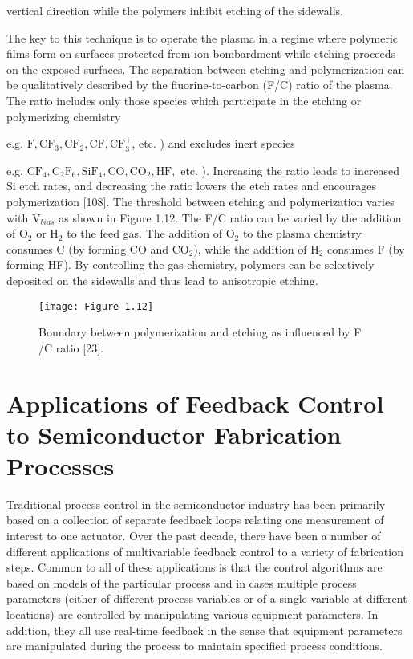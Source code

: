 {
\noindent vertical direction while the polymers inhibit etching of the sidewalls.
	
The key to this technique is to operate the plasma in a regime where polymeric films form on surfaces protected from ion bombardment while etching proceeds on the exposed surfaces. The separation between etching and polymerization can be qualitatively described by the fiuorine-to-carbon (F/C) ratio of the plasma. The ratio includes only those species which participate in the etching or polymerizing chemistry {e.g. $ \text{F}, \text{CF}_{3}, \text{CF}_{2}, \text{CF}, \text{CF}^{+}_{3} $, etc. ) and excludes inert species {e.g. $ \text{CF}_{4}, \text{C}_{2}\text{F}_{6}, \text{SiF}_{4}, \text{CO}, \text{CO}_{2}, \text{HF},$ etc. ). Increasing the ratio leads to increased Si etch rates, and decreasing the ratio lowers the etch rates and encourages polymerization [108]. The threshold between etching and polymerization varies with $\text{V}_{bias}$ as shown in Figure 1.12. The F/C ratio can be varied by the addition of $\text{O}_{2}$ or $\text{H}_{2}$ to the feed gas. The addition of $\text{O}_{2}$ to the plasma chemistry consumes C (by forming CO and $\text{CO}_{2}$), while the addition of $\text{H}_{2}$ consumes F (by forming HF). By controlling the gas chemistry, polymers can be selectively deposited on the sidewalls and thus lead to anisotropic etching.
			
\begin{figure}[H]
	\centering
	\texttt{[image: Figure 1.12]}
	\bf\caption{ Boundary between polymerization and etching as influenced by F /C ratio [23].}
	\label{fig:1.12}
\end{figure}		
			
\section{Applications of Feedback Control to Semiconductor Fabrication Processes}
			
\tab Traditional process control in the semiconductor industry has been primarily based on a collection of separate feedback loops relating one measurement of interest to one actuator. Over the past decade, there have been a number of different applications of multivariable feedback control to a variety of fabrication steps. Common to all of these applications is that the control algorithms are based on models of the particular process and in  cases multiple process parameters (either of different process variables or of a single variable at different locations) are controlled by manipulating various equipment parameters. In addition, they all use real-time feedback in the sense that equipment parameters are manipulated during the process to maintain specified process conditions.
			
}}}
